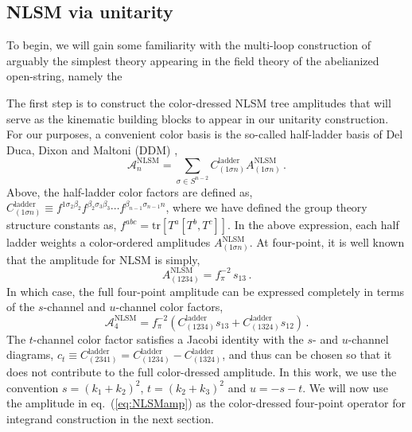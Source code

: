 \documentclass[12pt,letter]{article}
\def\eqn#1{eq.~(\ref{#1})}
\def\be{\begin{equation}}
\def\ee{\end{equation}}
\begin{document}
\subsection{NLSM via unitarity}\label{sec:NLSMU}
To begin, we will gain some familiarity with the multi-loop construction of arguably the simplest theory appearing in the field theory of the abelianized open-string, namely the 


The first step is to construct the color-dressed NLSM tree amplitudes that will serve as the kinematic building blocks to appear in our unitarity construction. For our purposes, a convenient color basis is the so-called half-ladder basis of Del Duca, Dixon and Maltoni (DDM) \cite{DixonMaltoni},
\begin{equation}
\mathcal{A}^{\text{NLSM}}_n = \sum_{\sigma \in S^{n-2}} C^{\text{ladder}}_{(1\sigma n)} A^{\text{NLSM}}_{(1\sigma n)}\,.
\end{equation}
Above, the half-ladder color factors are defined as, $C^{\text{ladder}}_{(1\sigma n)} \equiv f^{1\sigma_2 \beta_2}f^{\beta_2 \sigma_3 \beta_3} \cdots f^{\beta_{n-1}\sigma_{n-1}n}$, where we have defined the group theory structure constants as, $f^{abc}= \text{tr}[T^a[T^b,T^c]]$. In the above expression, each half ladder weights a color-ordered amplitudes $A^{\text{NLSM}}_{(1\sigma n)}$. At four-point, it is well known that the amplitude for NLSM is simply, 
\begin{equation}
A^{\text{NLSM}}_{(1234)} = f_\pi^{-2} \,s_{13}\,.
\end{equation}
In which case, the full four-point amplitude can be expressed completely in terms of the $s$-channel and $u$-channel color factors, 
\be\label{eq:NLSMamp} 
\mathcal{A}^{\text{NLSM}}_4 = f_\pi^{-2}\left(C^{\text{ladder}}_{(1234)} s_{13}+ C^{\text{ladder}}_{(1324)}s_{12}\right)\,.
\ee
The $t$-channel color factor satisfies a Jacobi identity with the $s$- and $u$-channel diagrams, $c_t \equiv C^{\text{ladder}}_{(2341)} = C^{\text{ladder}}_{(1234)}-C^{\text{ladder}}_{(1324)}$, and thus can be chosen so that it does not contribute to the full color-dressed amplitude. In this work, we use the convention $s=(k_1+k_2)^2$, $t=(k_2+k_3)^2$ and $u=-s-t$. We will now use the amplitude in \eqn{eq:NLSMamp} as the color-dressed four-point operator for integrand construction in the next section.
\end{document}
